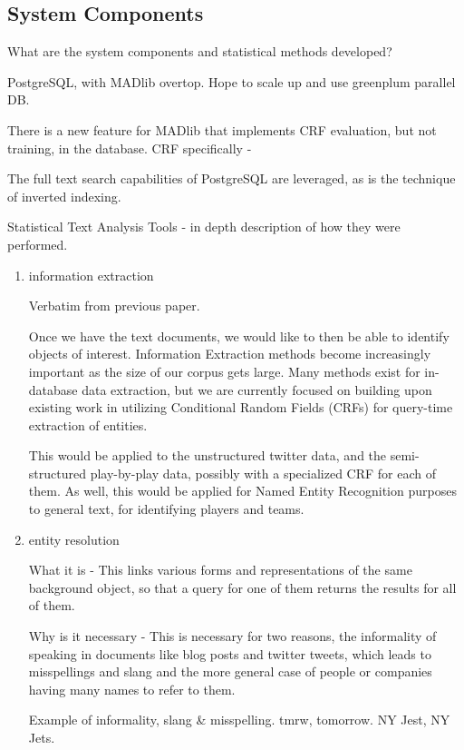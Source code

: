 \documentclass{article}
\begin{document}
\begin{enumerate}
  \subsection{System Components}
  What are the system components and statistical methods developed?

  PostgreSQL, with MADlib overtop.
  Hope to scale up and use greenplum parallel DB.

  There is a new feature for MADlib that implements CRF evaluation, but not training, in the database.
  CRF specifically -

  The full text search capabilities of PostgreSQL are leveraged,
  as is the technique of inverted indexing.


  Statistical Text Analysis Tools - in depth description of how they were performed.
  \begin{enumerate}
  \item information extraction

    Verbatim from previous paper.

    Once we have the text documents, we would like to then be able to identify
    objects of interest. Information Extraction methods become increasingly
    important as the size of our corpus gets large. Many methods exist for in-database data
    extraction, but we are currently focused on building upon existing work in
    utilizing Conditional Random Fields (CRFs) for query-time extraction of
    entities.

    This would be applied to the unstructured twitter data,
    and the semi-structured play-by-play data,
    possibly with a specialized CRF for each of them.
    As well, this would be applied for Named Entity Recognition purposes to general text, for identifying players and teams.

  \item entity resolution

    What it is -
    This links various forms and representations of the same background object,
    so that a query for one of them returns the results for all of them.

    Why is it necessary -
    This is necessary for two reasons,
    the informality of speaking in documents like blog posts and twitter tweets,
    which leads to misspellings and slang
    and the more  general case of people or companies having many names to refer to them.

    Example of informality, slang \& misspelling. tmrw, tomorrow. NY Jest, NY Jets.


\end{enumerate}
\end{enumerate}
\end{document}
